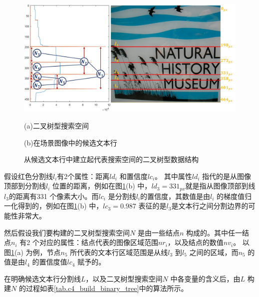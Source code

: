     \begin{figure}[!h]
    \centering
    \includegraphics[width=\textwidth]{./figures/c4_binary_tree_construction.jpg}
    \begin{minipage}[t]{0.40\linewidth}
    \centerline{\small (a)二叉树型搜索空间}
    \end{minipage}
    \begin{minipage}[t]{0.51\linewidth}
    \centerline{\small(b)在场景图像中的候选文本行}
    \end{minipage}
    \caption{从候选文本行中建立起代表搜索空间的二叉树型数据结构}
    \label{fig.c4_binary_tree_construction}
    \end{figure}

    假设红色分割线$l_i$有2个属性：距离$ld_i$ 和置信度$lc_i$。 其中属性$ld_i$ 指代的是从图像顶部到分割线$l_i$ 位置的距离，例如在图\ref{fig.c4_binary_tree_construction}(b) 中，$ld_3=331_{px}$就是指从图像顶部到线$l_3$的距离有331 个像素大小。而$lc_i$ 是分割线$l_i$的置信度，其数值是由$l_i$ 的梯度值归一化得到的，例如在图\ref{fig.c4_binary_tree_construction}(b) 中，$lc_3=0.987$ 表征的是$l_3$是文本行之间分割边界的可能性非常大。

    然后假设我们要构建的二叉树型搜索空间$N$ 是由一些结点$n$ 构成的。其中任一结点$n_i$ 有2 个对应的属性：结点代表的图像区域范围$nr_i$，以及结点的数值$nv_i$。 以图\ref{fig.c4_binary_tree_construction}(a) 为例，节点$n_5$ 所代表的文本行区域范围是从线$l_3$ 到$l_5$ 之间的区域，而$n_5$ 的值是由$l_4$ 的置信度值$lc_4$ 赋予的。

    在明确候选文本行分割线$L$，以及二叉树型搜索空间$N$ 中各变量的含义后，由$L$ 构建$N$ 的过程如表\ref{tab.c4_build_binary_tree}中的算法所示。

